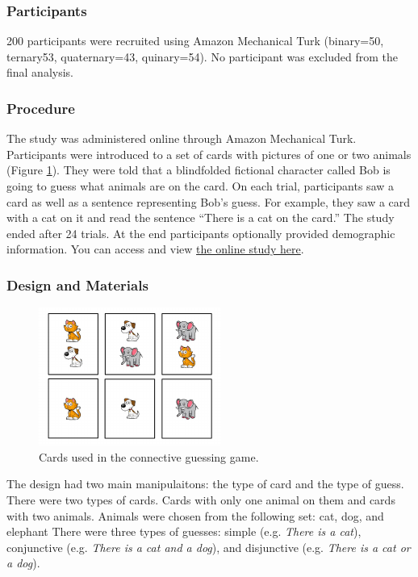 \documentclass[floatsintext,man]{apa6}
\theoremstyle{definition}
\theoremstyle{definition}
\theoremstyle{definition}
\theoremstyle{remark}
\begin{document}
\subsubsection{Participants}\label{participants}

200 participants were recruited using Amazon Mechanical Turk (binary=50,
ternary53, quaternary=43, quinary=54). No participant was excluded from
the final analysis.

\subsubsection{Procedure}\label{procedure}

The study was administered online through Amazon Mechanical Turk.
Participants were introduced to a set of cards with pictures of one or
two animals (Figure \ref{fig:stimuli}). They were told that a
blindfolded fictional character called Bob is going to guess what
animals are on the card. On each trial, participants saw a card as well
as a sentence representing Bob's guess. For example, they saw a card
with a cat on it and read the sentence \enquote{There is a cat on the
card.} The study ended after 24 trials. At the end participants
optionally provided demographic information. You can access and view
\href{**XXX\%20masoud\%20insert\%20link**}{the online study here}.

\subsubsection{Design and Materials}\label{design-and-materials}

\begin{figure}[t]

{\centering \includegraphics{writeup_files/figure-latex/stimuli-1} 

}

\caption{Cards used in the connective guessing game.}\label{fig:stimuli}
\end{figure}

The design had two main manipulaitons: the type of card and the type of
guess. There were two types of cards. Cards with only one animal on them
and cards with two animals. Animals were chosen from the following set:
cat, dog, and elephant There were three types of guesses: simple (e.g.
\emph{There is a cat}), conjunctive (e.g. \emph{There is a cat and a
dog}), and disjunctive (e.g. \emph{There is a cat or a dog}).
\end{document}

